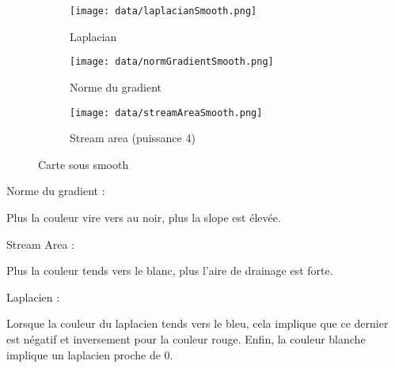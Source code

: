 \documentclass[11pt, letterpaper]{article}
\begin{document}
        \begin{figure}[!h]
            \begin{subfigure}[a]{0.3\textwidth}
                \centering
                \texttt{[image: data/laplacianSmooth.png]}
                \caption{Laplacian}
                \label{fig:laplacian_smooth}
            \end{subfigure}
            \hfill
            \begin{subfigure}[b]{0.3\textwidth}
                \centering
                \texttt{[image: data/normGradientSmooth.png]}
                \caption{Norme du gradient}
                \label{fig:gradient_smooth}
            \end{subfigure}
            \hfill
            \begin{subfigure}[c]{0.3\textwidth}
                \centering
                \texttt{[image: data/streamAreaSmooth.png]}
                \caption{Stream area (puissance 4)}
                \label{fig:stream_smooth}
            \end{subfigure}
            \label{fig:smooth_map}
            \caption{Carte sous smooth}
        \end{figure}
        
        \break
        Norme du gradient :

        Plus la couleur vire vers au noir, plus la slope est élevée.

        Stream Area :

        Plus la couleur tends vers le blanc, plus l'aire de drainage est forte.

        Laplacien :

        Lorsque la couleur du laplacien tends vers le bleu, cela implique que ce dernier est négatif et inversement pour la couleur rouge.
        Enfin, la couleur blanche implique un laplacien proche de 0. 
        
\end{document}
